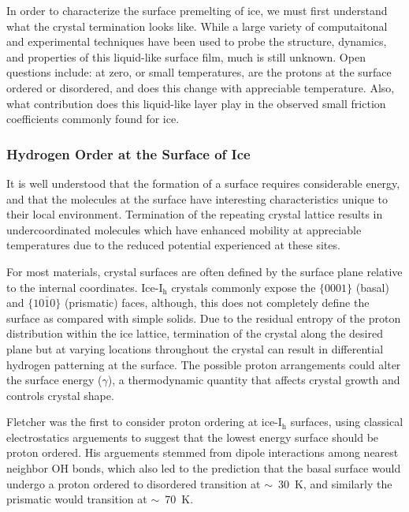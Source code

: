 In order to characterize the surface premelting of ice, we must first
understand what the crystal termination looks like. While a large
variety of computaitonal and experimental techniques have been used to
probe the structure, dynamics, and properties of this liquid-like
surface film, much is still unknown. Open questions include: at zero,
or small temperatures, are the protons at the surface ordered or
disordered, and does this change with appreciable temperature. Also,
what contribution does this liquid-like layer play in the observed
small friction coefficients commonly found for ice.

\subsubsection{Hydrogen Order at the Surface of Ice}
It is well understood that the formation of a surface requires
considerable energy, and that the molecules at the surface have
interesting characteristics unique to their local
environment. Termination of the repeating crystal lattice results in
undercoordinated molecules which have enhanced mobility at appreciable
temperatures due to the reduced potential experienced at these
sites.

For most materials, crystal surfaces are often defined by the surface
plane relative to the internal coordinates. Ice-I$_\mathrm{h}$
crystals commonly expose the $\{0001\}$ (basal) and $\{10\bar{1}0\}$
(prismatic) faces, although, this does not completely define the
surface as compared with simple solids. Due to the residual entropy of
the proton distribution within the ice lattice, termination of the
crystal along the desired plane but at varying locations throughout
the crystal can result in differential hydrogen patterning at the
surface. The possible proton arrangements could alter the surface
energy ($\gamma$), a thermodynamic quantity that affects crystal growth and
controls crystal shape.

Fletcher was the first to consider proton ordering at
ice-I$_\mathrm{h}$ surfaces, using classical electrostatics arguements
to suggest that the lowest energy surface should be proton
ordered.\cite{Fletcher1992} His arguements stemmed from dipole
interactions among nearest neighbor OH bonds, which also led to the
prediction that the basal surface would undergo a proton ordered to
disordered transition at $\sim$~30~K, and similarly the prismatic
would transition at $\sim$~70~K.

